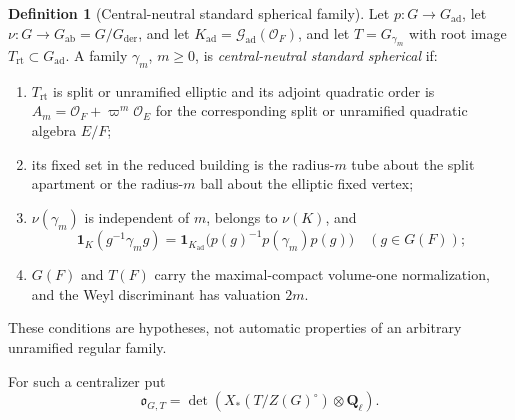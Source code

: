 \documentclass[11pt]{article}
\theoremstyle{definition}
\newtheorem{definition}[theorem]{Definition}
\theoremstyle{remark}
\newcommand{\Qell}{\mathbf Q_\ell}
\newcommand{\one}{\mathbf 1}
\newcommand{\rt}{\mathrm{rt}}
\newcommand{\ad}{\mathrm{ad}}
\newcommand{\ab}{\mathrm{ab}}
\newcommand{\der}{\mathrm{der}}
\newcommand{\cO}{\mathcal O}
\begin{document}
\begin{definition}[Central-neutral standard spherical family]
\label{def:standard-A1-family}
Let $p:G\to G_{\ad}$, let $\nu:G\to G_{\ab}=G/G_{\der}$, and let
$K_{\ad}=\mathcal G_{\ad}(\cO_F)$, and let
$T=G_{\gamma_m}$ with root image $T_{\rt}\subset G_{\ad}$.  A family
$\gamma_m$, $m\ge0$, is \emph{central-neutral standard spherical} if:
\begin{enumerate}[label=\textup{(\alph*)}]
\item $T_{\rt}$ is split or unramified elliptic and its adjoint quadratic
  order is $A_m=\cO_F+\varpi^m\cO_E$ for the corresponding split or
  unramified quadratic algebra $E/F$;
\item its fixed set in the reduced building is the radius-$m$ tube about the
  split apartment or the radius-$m$ ball about the elliptic fixed vertex;
\item $\nu(\gamma_m)$ is independent of $m$, belongs to $\nu(K)$, and
  \begin{equation}
   \one_K(g^{-1}\gamma_mg)
   =\one_{K_{\ad}}\bigl(p(g)^{-1}p(\gamma_m)p(g)\bigr)
   \quad(g\in G(F));
   \label{eq:central-neutral-support}
  \end{equation}
\item $G(F)$ and $T(F)$ carry the maximal-compact volume-one normalization,
  and the Weyl discriminant has valuation $2m$.
\end{enumerate}
These conditions are hypotheses, not automatic properties of an arbitrary
unramified regular family.
\end{definition}

For such a centralizer put
\begin{equation}
 \mathfrak o_{G,T}
 =\det\!\left(X_*(T/Z(G)^\circ)\otimes\Qell\right).
 \label{eq:root-orientation-line}
\end{equation}
\end{document}
